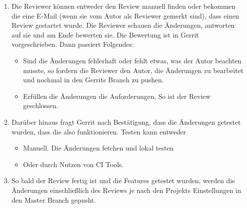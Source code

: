 \begin{itemize}
\begin{enumerate}
			\item Die Reviewer können entweder den Review manuell finden oder bekommen die eine E-Mail (wenn sie vom Autor als Reviewer gemerkt sind), dass einen Review
				 gestartet wurde. Die Reviewer schauen die Änderungen, antworten auf sie und am Ende bewerten sie. Die Bewertung ist in Gerrit vorgeschrieben.
				 Dann passiert Folgendes:
				 \begin{itemize}
				 	\item Sind die Änderungen fehlerhaft oder fehlt etwas, was der Autor beachten musste, so fordern die Reviewer den Autor, die Änderungen zu bearbeitet
				 		und nochmal in den Gerrits Branch zu pushen.
				 	\item Erfüllen die Änderungen die Anforderungen, So ist der Review geschlossen.
				 \end{itemize}
			\item Darüber hinaus fragt Gerrit nach Bestätigung, dass die Änderungen getestet wurden, dass die also funktionieren. Testen kann entweder 
			\begin{itemize}
				\item Manuell. Die Änderungen fetchen und lokal testen
				\item Oder durch Nutzen von \ac{CI} Tools.
			\end{itemize}
			\item So bald der Review fertig ist und die Features getestet wurden, werden die Änderungen einschließlich des Reviews je nach den Projekts Einstellungen in
				den Master Branch gepusht.
		\end{enumerate}
		
\end{itemize}


